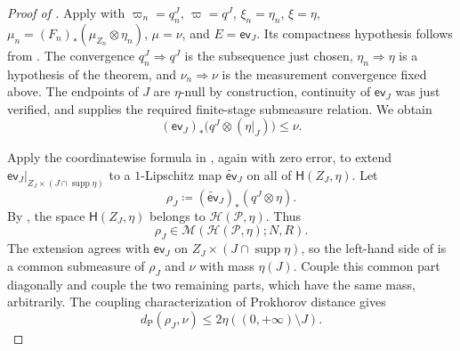 \documentclass[10pt,a4paper]{amsart}
\numberwithin{equation}{section}
\DeclareMathOperator{\supp}{supp}
\begin{document}
\begin{proof}[Proof of ]
Apply  with
$\varpi_n=q_n^J$, $\varpi=q^J$, $\xi_n=\eta_n$, $\xi=\eta$,
$\mu_n=(F_n)_*(\mu_{Z_n}\otimes\eta_n)$, $\mu=\nu$, and $E=\mathsf{ev}_J$.  Its compactness hypothesis follows
from .  The convergence $q_n^J\Rightarrow q^J$ is the subsequence just chosen,
$\eta_n\Rightarrow\eta$ is a hypothesis of the theorem, and $\nu_n\Rightarrow\nu$ is the measurement convergence
fixed above.  The endpoints of $J$ are $\eta$-null by construction, continuity of $\mathsf{ev}_J$ was just verified,
and  supplies the required finite-stage submeasure relation.  We obtain
\begin{equation}\label{eq:joint-profile-submeasure-limit}
 (\mathsf{ev}_J)_*\bigl(q^J\otimes(\eta|_J)\bigr)
 \le\nu.
\end{equation}

Apply the coordinatewise formula in , again with zero error, to extend
$\mathsf{ev}_J|_{Z_J\times(J\cap\supp\eta)}$ to a $1$-Lipschitz map
$\widetilde{\mathsf{ev}}_J$ on all of $\mathsf H(Z_J,\eta)$.  Let
\[
 \rho_J\coloneqq(\widetilde{\mathsf{ev}}_J)_*(q^J\otimes\eta).
\]
By , the space $\mathsf H(Z_J,\eta)$ belongs to
$\mathcal H(\mathcal P,\eta)$.  Thus
\begin{equation}\label{eq:joint-target-measurement}
 \rho_J\in\mathcal M(\mathcal H(\mathcal P,\eta);N,R).
\end{equation}
The extension agrees with $\mathsf{ev}_J$ on $Z_J\times(J\cap\supp\eta)$, so the left-hand side of
 is a common submeasure of $\rho_J$ and $\nu$ with mass $\eta(J)$.
Couple this common part diagonally and couple the two remaining parts, which have the same mass, arbitrarily.  The
coupling characterization of Prokhorov distance gives
\begin{equation}\label{eq:joint-exhaustion-distance}
 d_{\mathrm P}(\rho_J,\nu)
 \le2\eta((0,+\infty)\setminus J).
\end{equation}


\end{proof}
\end{document}
